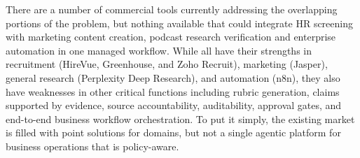 There are a number of commercial tools currently addressing the overlapping portions of the problem, but nothing available that could integrate HR screening with marketing content creation, podcast research verification and enterprise automation in one managed workflow. While all have their strengths in recruitment (HireVue, Greenhouse, and Zoho Recruit), marketing (Jasper), general research (Perplexity Deep Research), and automation (n8n), they also have weaknesses in other critical functions including rubric generation, claims supported by evidence, source accountability, auditability, approval gates, and end-to-end business workflow orchestration. To put it simply, the existing market is filled with point solutions for domains, but not a single agentic platform for business operations that is policy-aware.
\clearpage
